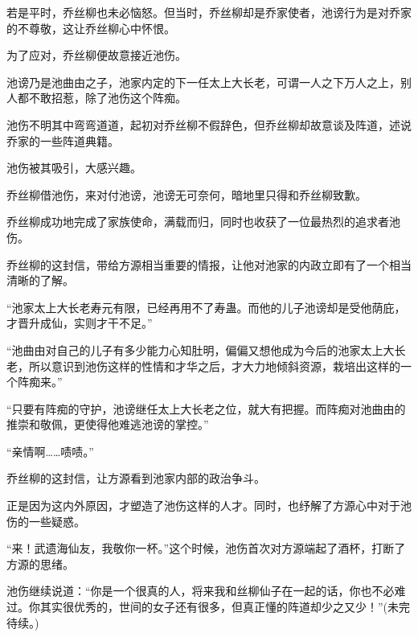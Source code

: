 \begin{this_body}
若是平时，乔丝柳也未必恼怒。但当时，乔丝柳却是乔家使者，池谤行为是对乔家的不尊敬，这让乔丝柳心中怀恨。

为了应对，乔丝柳便故意接近池伤。

池谤乃是池曲由之子，池家内定的下一任太上大长老，可谓一人之下万人之上，别人都不敢招惹，除了池伤这个阵痴。

池伤不明其中弯弯道道，起初对乔丝柳不假辞色，但乔丝柳却故意谈及阵道，述说乔家的一些阵道典籍。

池伤被其吸引，大感兴趣。

乔丝柳借池伤，来对付池谤，池谤无可奈何，暗地里只得和乔丝柳致歉。

乔丝柳成功地完成了家族使命，满载而归，同时也收获了一位最热烈的追求者池伤。

乔丝柳的这封信，带给方源相当重要的情报，让他对池家的内政立即有了一个相当清晰的了解。

“池家太上大长老寿元有限，已经再用不了寿蛊。而他的儿子池谤却是受他荫庇，才晋升成仙，实则才干不足。”

“池曲由对自己的儿子有多少能力心知肚明，偏偏又想他成为今后的池家太上大长老，所以意识到池伤这样的性情和才华之后，才大力地倾斜资源，栽培出这样的一个阵痴来。”

“只要有阵痴的守护，池谤继任太上大长老之位，就大有把握。而阵痴对池曲由的推崇和敬佩，更使得他难逃池谤的掌控。”

“亲情啊……啧啧。”

乔丝柳的这封信，让方源看到池家内部的政治争斗。

正是因为这内外原因，才塑造了池伤这样的人才。同时，也纾解了方源心中对于池伤的一些疑惑。

“来！武遗海仙友，我敬你一杯。”这个时候，池伤首次对方源端起了酒杯，打断了方源的思绪。

池伤继续说道：“你是一个很真的人，将来我和丝柳仙子在一起的话，你也不必难过。你其实很优秀的，世间的女子还有很多，但真正懂的阵道却少之又少！”(未完待续。)

\end{this_body}

